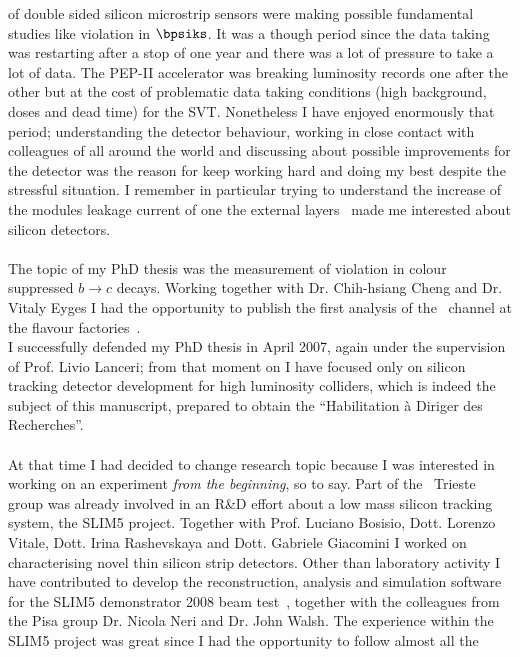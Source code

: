 of double sided silicon microstrip sensors were making possible fundamental studies like \CP violation in $\bpsiks$. It was a though period since the data taking was restarting after a stop of one year and there 
was a lot of pressure to take a lot of data. The PEP-II accelerator was breaking luminosity records 
one after the other but at the cost of problematic data taking conditions (high background, doses 
and dead time) for the SVT. Nonetheless I have enjoyed enormously that period; understanding 
the detector behaviour, working in close contact with colleagues of all around the world and discussing 
about possible improvements for the detector was the reason for keep working hard and doing my best 
despite the stressful situation. I remember in particular trying to understand the increase of the modules 
leakage current of one the external layers~\cite{babar_leakage} made me interested about silicon detectors.
\\
\\The topic of my PhD thesis was the measurement of \CP violation in colour suppressed $b\to c$ decays.
Working together with Dr. Chih-hsiang Cheng and Dr.  Vitaly Eyges I had the opportunity to publish 
the first analysis of the \BDh\ channel at the flavour factories~\cite{PhysRevLett.99.081801}.
\\ I successfully defended my PhD thesis in April 2007, again under the supervision of Prof. Livio Lanceri;
  from that moment on I have focused only on 
silicon tracking detector development for high luminosity colliders, which is indeed the subject of this 
manuscript, prepared to obtain the  ``Habilitation \`a Diriger des Recherches''.
\\
\\
At that time I had decided to change research topic because I was interested in working on an experiment 
{\it from the beginning}, so to say. Part of the   \babar\ Trieste group was already involved in an R\&D 
effort about a low mass silicon tracking system, the SLIM5 project. 
Together with Prof. Luciano Bosisio, Dott. Lorenzo Vitale, Dott. Irina Rashevskaya and Dott. Gabriele 
Giacomini I worked on characterising novel thin silicon strip detectors. Other than laboratory activity 
I have contributed to develop the reconstruction, analysis and simulation software for the SLIM5 
demonstrator 2008 beam test~\cite{BETTARINI2010942}, together with the colleagues from the Pisa group 
Dr. Nicola Neri and Dr. John Walsh.  
The experience within the SLIM5 project  was great since I had the opportunity to follow almost all the  
